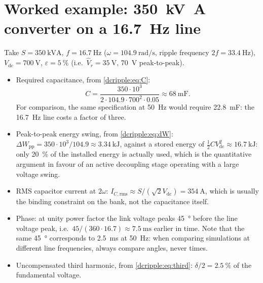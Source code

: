 \section{Worked example: \SI{350}{\kilo\volt\ampere} converter on a \SI{16.7}{\hertz} line}

Take $S=\SI{350}{\kilo\volt\ampere}$, $f=\SI{16.7}{\hertz}$
($\omega = \SI{104.9}{\radian\per\second}$, ripple frequency
$2f=\SI{33.4}{\hertz}$), $V_{\mathrm{dc}}=\SI{700}{\volt}$,
$\varepsilon = \SI{5}{\percent}$ (i.e.\ $\hat V_r = \SI{35}{\volt}$,
\SI{70}{\volt} peak-to-peak).

\begin{itemize}
  \item Required capacitance, from \eqref{dcripple:eq:C}:
        \begin{equation}
          C = \frac{350\cdot 10^{3}}
                   {2\cdot 104.9 \cdot 700^{2}\cdot 0.05}
            \approx \SI{68}{\milli\farad}.
        \end{equation}
        For comparison, the same specification at \SI{50}{\hertz} would require
        \SI{22.8}{\milli\farad}: the \SI{16.7}{\hertz} line costs a factor of
        three.
  \item Peak-to-peak energy swing, from \eqref{dcripple:eq:dW}:
        $\Delta W_{\mathrm{pp}} = 350\cdot10^{3}/104.9 \approx \SI{3.34}{\kilo\joule}$,
        against a stored energy of
        $\tfrac12 C V_{\mathrm{dc}}^2 \approx \SI{16.7}{\kilo\joule}$: only
        \SI{20}{\percent} of the installed energy is actually used, which is the
        quantitative argument in favour of an active decoupling stage operating
        with a large voltage swing.
  \item RMS capacitor current at $2\omega$:
        $I_{C,\mathrm{rms}} \approx S/(\sqrt2 V_{\mathrm{dc}})
        = \SI{354}{\ampere}$, which is usually the binding constraint on the
        bank, not the capacitance itself.
  \item Phase: at unity power factor the link voltage peaks
        \SI{45}{\degree} before the line voltage peak, i.e.\
        $45/(360\cdot16.7) \approx \SI{7.5}{\milli\second}$ earlier in time.
        Note that the same \SI{45}{\degree} corresponds to \SI{2.5}{\milli\second}
        at \SI{50}{\hertz}: when comparing simulations at different line
        frequencies, always compare angles, never times.
  \item Uncompensated third harmonic, from \eqref{dcripple:eq:third}:
        $\delta/2 = \SI{2.5}{\percent}$ of the fundamental voltage.
\end{itemize}

